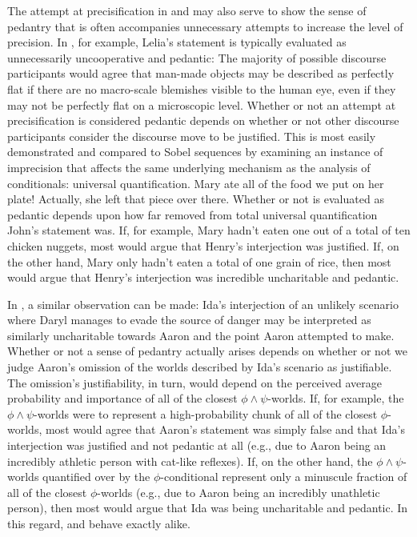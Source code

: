 The attempt at precisification in  and  may also serve to show the sense of pedantry that is often accompanies unnecessary attempts to increase the level of precision. In , for example, Lelia's statement is typically evaluated as unnecessarily uncooperative and pedantic: The majority of possible discourse participants would agree that man-made objects may be described as perfectly flat if there are no macro-scale blemishes visible to the human eye, even if they may not be perfectly flat on a microscopic level. Whether or not an attempt at precisification is considered pedantic depends on whether or not other discourse participants consider the discourse move to be justified. This is most easily demonstrated and compared to Sobel sequences by examining an instance of imprecision that affects the same underlying mechanism as the analysis of conditionals: universal quantification.
\pex{}
			\a	{}Mary ate all of the food we put on her plate!
			\a	{}Actually, she left that piece over there.
\xe
Whether or not  is evaluated as pedantic depends upon how far removed from total universal quantification John's statement was. If, for example, Mary hadn't eaten one out of a total of ten chicken nuggets, most would argue that Henry's interjection was justified. If, on the other hand, Mary only hadn't eaten a total of one grain of rice, then most would argue that Henry's interjection was incredible uncharitable and pedantic.

In , a similar observation can be made: Ida's interjection of an unlikely scenario where Daryl manages to evade the source of danger may be interpreted as similarly uncharitable towards Aaron and the point Aaron attempted to make. Whether or not a sense of pedantry actually arises depends on whether or not we judge Aaron's omission of the worlds described by Ida's scenario as justifiable. The omission's justifiability, in turn, would depend on the perceived average probability and importance of all of the closest $\phi\land\psi$-worlds. If, for example, the $\phi\land\psi$-worlds were to represent a high-probability chunk of all of the closest $\phi$-worlds, most would agree that Aaron's statement was simply false and that Ida's interjection was justified and not pedantic at all (e.g., due to Aaron being an incredibly athletic person with cat-like reflexes). If, on the other hand, the $\phi\land\psi$-worlds quantified over by the $\phi$-conditional represent only a minuscule fraction of all of the closest $\phi$-worlds (e.g., due to Aaron being an incredibly unathletic person), then most would argue that Ida was being uncharitable and pedantic. In this regard,  and  behave exactly alike.

